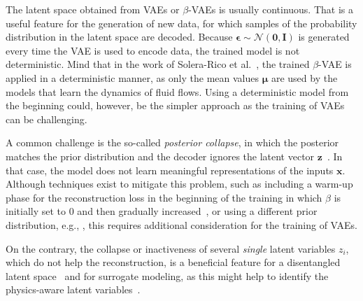 The latent space obtained from VAEs or $\beta$-VAEs is usually continuous. That is a useful feature for the generation of new data, for which samples of the probability distribution in the latent space are decoded. 
Because $\boldsymbol{\epsilon}\sim \mathcal{N}(\mathbf{0},\mathbf{I})$ is generated every time the VAE is used to encode data, the trained model is not deterministic. 
Mind that in the work of Solera-Rico et al.~\cite{solera-rico:2024}, the trained $\beta$-VAE is applied in a deterministic manner, as only the mean values $\boldsymbol{\mu}$ are used by the models that learn the dynamics of fluid flows. 
Using a deterministic model from the beginning could, however, be the simpler approach as the training of VAEs can be challenging. 


A common challenge is the so-called \emph{posterior collapse}, in which the posterior matches the prior distribution and the decoder ignores the latent vector $\mathbf{z}$~\cite{bowman2016generating, ladder_vae, lucas2019understanding}. In that case, the model does not learn meaningful representations of the inputs $\mathbf{x}$. Although techniques exist to mitigate this problem, such as including a warm-up phase for the reconstruction loss in the beginning of the training in which $\beta$ is initially set to 0 and then gradually increased~\cite{bowman2016generating, ladder_vae}, or using a different prior distribution, e.g., \cite{NIPS2017_7a98af17, davidson2022hypersphericalvariationalautoencoders}, this requires additional consideration for the training of VAEs. 

On the contrary, the collapse or inactiveness of several \emph{single} latent variables $z_i$, which do not help the reconstruction, is a beneficial feature for a disentangled latent space~\cite{burgess2018understandingdisentanglingbetavae} and for surrogate modeling, as this might help to identify the physics-aware latent variables~\cite{kang:2022}.

